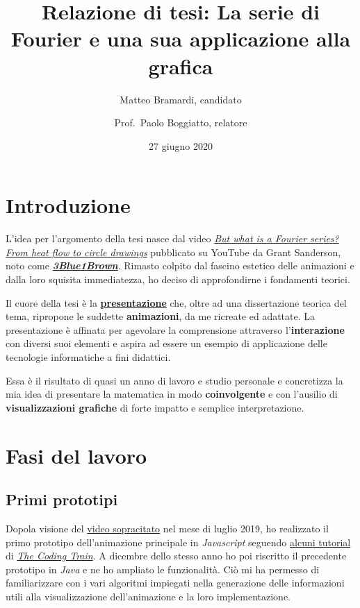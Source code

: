 \documentclass[
]{book}
\title{Relazione di tesi: La serie di Fourier e una sua applicazione alla grafica}
\author{Matteo Bramardi, candidato \and Prof.~Paolo Boggiatto, relatore}
\date{27 giugno 2020}
\begin{document}
\maketitle

{
\setcounter{tocdepth}{1}
\tableofcontents
}
\hypertarget{introduzione}{%
\chapter*{Introduzione}\label{introduzione}}

L'idea per l'argomento della tesi nasce dal video \href{https://www.youtube.com/watch?v=r6sGWTCMz2k}{\emph{But what is a Fourier series? From heat flow to circle drawings}} pubblicato su YouTube da Grant Sanderson, noto come \href{https://www.youtube.com/c/3blue1brown}{\emph{\textbf{3Blue1Brown}}}. Rimasto colpito dal fascino estetico delle animazioni e dalla loro squisita immediatezza, ho deciso di approfondirne i fondamenti teorici.

Il cuore della tesi è la \href{https://bradwave.github.io/thesis}{\textbf{presentazione}} che, oltre ad una dissertazione teorica del tema, ripropone le suddette \textbf{animazioni}, da me ricreate ed adattate. La presentazione è affinata per agevolare la comprensione attraverso l'\textbf{interazione} con diversi suoi elementi e aspira ad essere un esempio di applicazione delle tecnologie informatiche a fini didattici.

Essa è il risultato di quasi un anno di lavoro e studio personale e concretizza la mia idea di presentare la matematica in modo \textbf{coinvolgente} e con l'ausilio di \textbf{visualizzazioni grafiche} di forte impatto e semplice interpretazione.

\hypertarget{lavoro}{%
\chapter{Fasi del lavoro}\label{lavoro}}

\hypertarget{prototipi}{%
\section{Primi prototipi}\label{prototipi}}

Dopola visione del \href{https://www.youtube.com/watch?v=r6sGWTCMz2k}{video sopracitato} nel mese di luglio 2019, ho realizzato il primo prototipo dell'animazione principale in \emph{Javascript} seguendo \href{https://www.youtube.com/watch?v=MY4luNgGfms}{alcuni tutorial} di \href{https://www.youtube.com/thecodingtrain}{\emph{The Coding Train}}. A dicembre dello stesso anno ho poi riscritto il precedente prototipo in \emph{Java} e ne ho ampliato le funzionalità. Ciò mi ha permesso di familiarizzare con i vari algoritmi impiegati nella generazione delle informazioni utili alla visualizzazione dell'animazione e la loro implementazione.
\end{document}
